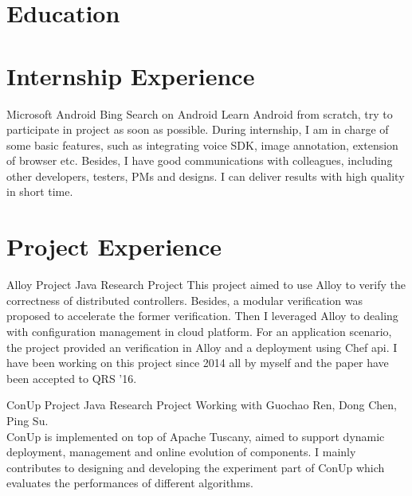 \documentclass[11pt,a4paper]{moderncv}
\title{}
\begin{document}
\maketitle

\section{Education}

\section{Internship Experience}

{Microsoft}
{Android}
{Bing Search on Android}{}
{
Learn Android from scratch, try to participate in project as soon as possible. During internship, I am in charge of some basic features, such as integrating voice SDK, image annotation, extension of browser etc. Besides, I have good communications with colleagues, including other developers, testers, PMs and designs. I can deliver results with high quality in short time.
}

\section{Project Experience}

{Alloy Project}
{Java}
{Research Project}{}
{
This project aimed to use Alloy to verify the correctness of distributed controllers. Besides, a modular verification was proposed to accelerate the former verification. Then I leveraged Alloy to dealing with configuration management in cloud platform. For an application scenario, the project provided an verification in Alloy and a deployment using Chef api. I have been working on this project since 2014 all
by myself and the paper have been accepted to QRS '16.
}

\vspace*{0.2\baselineskip}

{ConUp Project}
{Java}
{Research Project}{}
{
Working with Guochao Ren, Dong Chen, Ping Su.\\
ConUp is implemented on top of Apache Tuscany, aimed to support dynamic deployment, management and online evolution of components. I mainly contributes to designing and developing the experiment part of ConUp which evaluates the performances of different algorithms.
}
\end{document}
